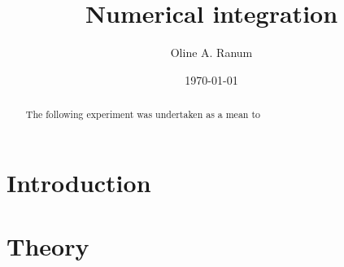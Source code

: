 \documentclass[%
reprint,
amsmath,amssymb,
aps,
]{revtex4-1}
\begin{document}
\title{Numerical integration}
\author{Oline A. Ranum}
\date{\today}


\begin{abstract}
	The following experiment was undertaken as a mean to 
\end{abstract}
\maketitle

\section{Introduction}


\section{Theory}
\end{document}
